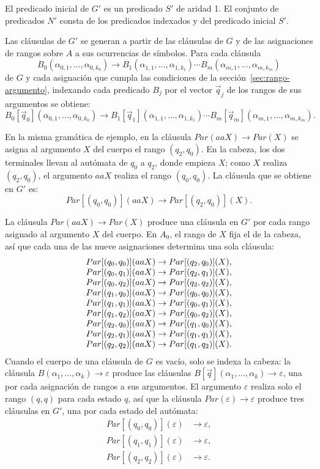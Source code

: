 \documentclass{report}
\theoremstyle{definition}
\theoremstyle{plain}
\theoremstyle{remark}
\begin{document}
El predicado inicial de $G'$ es un predicado $S'$ de aridad 1. El
conjunto de predicados $N'$ consta de los predicados indexados y del
predicado inicial $S'$.

Las cláusulas de $G'$ se generan a partir de las cláusulas de $G$ y de
las asignaciones de rangos sobre $A$ a sus ocurrencias de símbolos. Para
cada cláusula
\[
  B_0(\alpha_{0,1}, \ldots, \alpha_{0,k_0}) \to
  B_1(\alpha_{1,1}, \ldots, \alpha_{1,k_1}) \cdots
  B_m(\alpha_{m,1}, \ldots, \alpha_{m,k_m})
\]
de $G$ y cada asignación que cumpla las condiciones de la
sección~\ref{sec:rango-argumento}, indexando cada predicado $B_j$ por el
vector $\vec q_j$ de los rangos de sus argumentos se obtiene:
\[
  B_0[\vec q_0](\alpha_{0,1}, \ldots, \alpha_{0,k_0}) \to
  B_1[\vec q_1](\alpha_{1,1}, \ldots, \alpha_{1,k_1}) \cdots
  B_m[\vec q_m](\alpha_{m,1}, \ldots, \alpha_{m,k_m}).
\]

En la misma gramática de ejemplo, en la cláusula
$Par(aaX) \to Par(X)$ se asigna al argumento $X$ del cuerpo el rango
$(q_2, q_0)$. En la cabeza, los dos terminales llevan al autómata de
$q_0$ a $q_2$, donde empieza $X$; como $X$ realiza $(q_2, q_0)$, el
argumento $aaX$ realiza el rango $(q_0, q_0)$. La cláusula que se
obtiene en $G'$ es:
\[
  Par[(q_0, q_0)](aaX) \to Par[(q_2, q_0)](X).
\]

La cláusula $Par(aaX) \to Par(X)$ produce una cláusula en $G'$ por
cada rango asignado al argumento $X$ del cuerpo. En $A_0$, el rango de
$X$ fija el de la cabeza, así que cada una de las nueve asignaciones determina
una sola cláusula:
\[
\begin{array}{r@{\;\to\;}l}
Par[(q_0, q_0)](aaX) & Par[(q_2, q_0)](X), \\
Par[(q_0, q_1)](aaX) & Par[(q_2, q_1)](X), \\
Par[(q_0, q_2)](aaX) & Par[(q_2, q_2)](X), \\
Par[(q_1, q_0)](aaX) & Par[(q_0, q_0)](X), \\
Par[(q_1, q_1)](aaX) & Par[(q_0, q_1)](X), \\
Par[(q_1, q_2)](aaX) & Par[(q_0, q_2)](X), \\
Par[(q_2, q_0)](aaX) & Par[(q_1, q_0)](X), \\
Par[(q_2, q_1)](aaX) & Par[(q_1, q_1)](X), \\
Par[(q_2, q_2)](aaX) & Par[(q_1, q_2)](X).
\end{array}
\]
Cuando el cuerpo de una cláusula de $G$ es vacío, solo se indexa la
cabeza: la cláusula $B(\alpha_1, \ldots, \alpha_k) \to \varepsilon$
produce las cláusulas $B[\vec q](\alpha_1, \ldots, \alpha_k) \to
\varepsilon$, una por cada asignación de rangos a sus argumentos. El
argumento $\varepsilon$ realiza solo el rango $(q, q)$ para cada estado
$q$, así que la cláusula $Par(\varepsilon) \to \varepsilon$ produce
tres cláusulas en $G'$, una por cada estado del autómata:
\begin{align*}
  Par[(q_0, q_0)](\varepsilon) &\to \varepsilon, \\
  Par[(q_1, q_1)](\varepsilon) &\to \varepsilon, \\
  Par[(q_2, q_2)](\varepsilon) &\to \varepsilon.
\end{align*}
\end{document}
